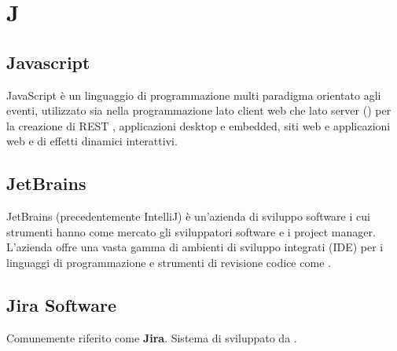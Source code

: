 \chapter{J}

\section{Javascript}
JavaScript è un linguaggio di programmazione multi paradigma orientato agli eventi, utilizzato sia nella programmazione lato client web che lato server () per la creazione di REST , applicazioni desktop e embedded, siti web e applicazioni web e di effetti dinamici interattivi.

\section{JetBrains}
JetBrains (precedentemente IntelliJ) è un'azienda di sviluppo software i cui strumenti hanno come mercato gli sviluppatori software e i project manager. L'azienda offre una vasta gamma di ambienti di sviluppo integrati (IDE) per i linguaggi di programmazione e strumenti di revisione codice come . 

\section{Jira Software}\label{sec:Jira}
Comunemente riferito come \textbf{Jira}. Sistema di  sviluppato da .


